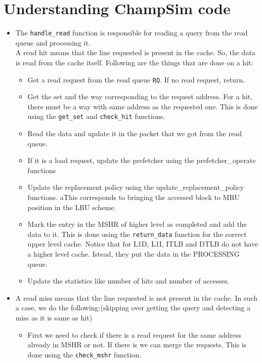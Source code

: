 \documentclass[11pt, swedish, openany]{book}
\begin{document}
\section{Understanding ChampSim code}
\begin{itemize}
    \item The \texttt{handle\_read} function is responsible for reading a query from the read queue and processing it.\\
          A read hit means that the line requested is present in the cache. So, the data is read from the cache itself. Following are the things that are done on a hit:
          \begin{itemize}
              \item Get a read request from the read queue \texttt{RQ}. If no read request, return.
              \item Get the set and the way corresponding to the request address. For a hit, there must be a way with same address as the requested one. This is done using the \texttt{get\_set} and \texttt{check\_hit} functions.
              \item Read the data and update it in the packet that we got from the read queue.
              \item If it is a load request, update the prefetcher using the prefetcher\_operate functions
              \item Update the replacement policy using the update\_replacement\_policy functions. aThis corresponds to bringing the accessed block to MRU position in the LRU scheme.
              \item Mark the entry in the MSHR of higher level as completed and add the data to it. This is done using the \texttt{return\_data} function for the correct upper level cache. Notice that for L1D, L1I, ITLB and DTLB do not have a higher level cache. Istead, they put the data in the PROCESSING queue.
              \item Update the statistics like number of hits and number of accesses.
          \end{itemize}
    \item A read miss means that the line requested is not present in the cache. In such a case, we do the following:(skipping over getting the query and detecting a miss as it is same as hit)
          \begin{itemize}
              \item First we need to check if there is a read request for the same address already in MSHR or not. If there is we can merge the requests. This is done using the \texttt{check\_mshr} function.

\end{itemize}
\end{itemize}
\end{document}
